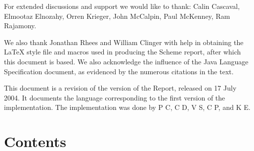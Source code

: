 For extended discussions and support we would like to thank: Calin
Cascaval, Elmootaz Elnozahy, Orren Krieger, John McCalpin, Paul
McKenney, Ram Rajamony.

We also thank Jonathan Rhees and William Clinger with help in
obtaining the \LaTeX{} style file and macros used in producing the
Scheme report, after which this document is based. We also acknowledge
the influence of the Java Language Specification \cite{jls2} document,
as evidenced by the numerous citations in the text.

This document is a revision of the {} version of the Report,
released on 17 July 2004. It documents the language corresponding to
the first version of the implementation.  The implementation was done
by P C, C
D, V S,
C P, and K
E.




\vfill
\eject


\chapter*{Contents}
\addvspace{3.5pt}                  %
\renewcommand{\tocshrink}{-3.5pt}  %
{\footnotesize
\tableofcontents
}

\vfill
\eject


